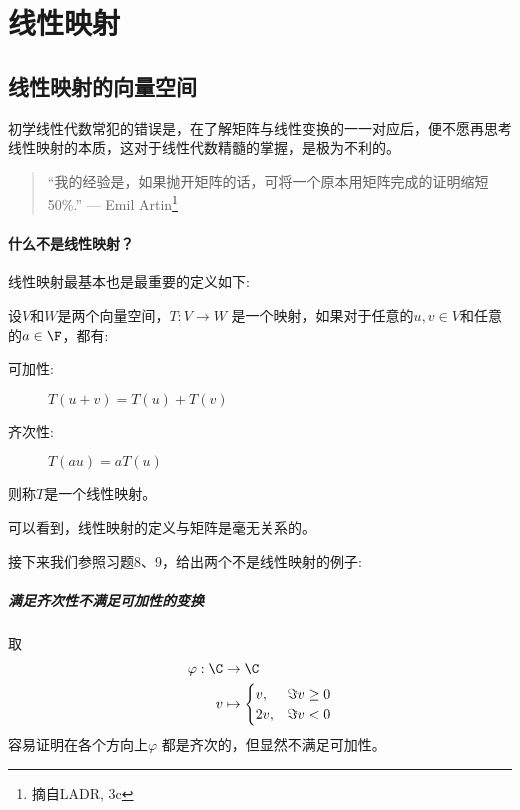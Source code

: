 \chapter{线性映射}
\section{线性映射的向量空间}
初学线性代数常犯的错误是，在了解矩阵与线性变换的一一对应后，便不愿再思考线性映射的本质，这对于线性代数精髓的掌握，是极为不利的。
\begin{quote}
  ``我的经验是，如果抛开矩阵的话，可将一个原本用矩阵完成的证明缩短 50\%.''
  \hfill --- Emil Artin\footnote{摘自LADR, 3c}
\end{quote}
\subsubsection{什么不是线性映射？}
线性映射最基本也是最重要的定义如下:
\begin{definition}
  设\(V\)和\(W\)是两个向量空间，\(T: V \to W\) 是一个映射，如果对于任意的\(u,
  v \in V\)和任意的\(a \in \F\)，都有:
  \begin{description}
    \item[可加性:] \(T(u+v)=T(u)+T(v)\)
    \item[齐次性:] \(T(a u) = a T(u)\)
  \end{description}
  则称\(T\)是一个线性映射。
\end{definition}
可以看到，线性映射的定义与矩阵是毫无关系的。

接下来我们参照习题8、9，给出两个不是线性映射的例子:

\paragraph{满足齐次性不满足可加性的变换}
取
\begin{align*}
  \varphi: \C &\to \C \\
  v &\mapsto
  \begin{cases}
    v, &\Im v \geq 0 \\
    2v, &\Im v < 0
  \end{cases}
\end{align*}
容易证明在各个方向上\(\varphi\) 都是齐次的，但显然不满足可加性。

